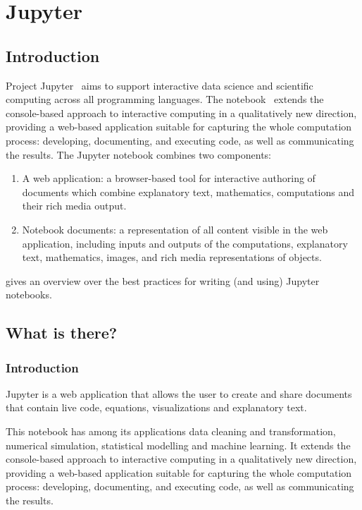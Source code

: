 \section{Jupyter}\label{sec:jupyter}

\subsection{Introduction}

Project Jupyter~\cite{jupyter-project:on,jupyter-doc:on,jupyter-git:on} aims to support
interactive data science and scientific computing across all programming languages. The
notebook~\cite{jupyter-notebook:on} extends the console-based approach to interactive
computing in a qualitatively new direction, providing a web-based application suitable for
capturing the whole computation process: developing, documenting, and executing code, as
well as communicating the results. The Jupyter notebook combines two components:
\begin{enumerate}
\item A web application: a browser-based tool for interactive authoring of documents which
  combine explanatory text, mathematics, computations and their rich media output.
\item Notebook documents: a representation of all content visible in the web application,
  including inputs and outputs of the computations, explanatory text, mathematics, images,
  and rich media representations of objects.
\end{enumerate}
\cite{juplit:on} gives an overview over the best practices for writing (and using)
Jupyter notebooks.

\subsection{What is there?}

\subsubsection{Introduction}
Jupyter is a web application that allows the user to create and share documents that
contain live code, equations, visualizations and explanatory text.

This notebook has among its applications data cleaning and transformation, numerical
simulation, statistical modelling and machine learning. It extends the console-based
approach to interactive computing in a qualitatively new direction, providing a web-based
application suitable for capturing the whole computation process: developing, documenting,
and executing code, as well as communicating the results.

